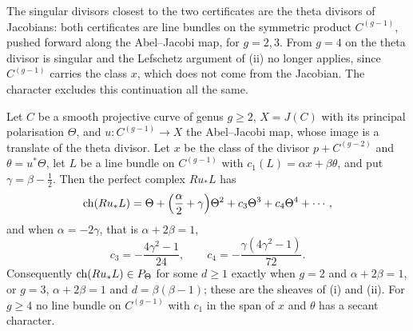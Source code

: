 The singular divisors closest to the two certificates are the theta divisors
of Jacobians: both certificates are line bundles on the symmetric product
$C^{(g-1)}$, pushed forward along the Abel--Jacobi map, for $g=2,3$. From
$g=4$ on the theta divisor is singular and the Lefschetz argument of
(ii) no longer applies, since $C^{(g-1)}$ carries
the class $x$, which does not come from the Jacobian. The character excludes
this continuation all the same.

\begin{proposition}
\label{prop:jacobiancontinuation}
Let $C$ be a smooth projective curve of genus $g\ge2$, $X=J(C)$ with its
principal polarisation $\Theta$, and $u\colon C^{(g-1)}\to X$ the
Abel--Jacobi map, whose image is a translate of the theta divisor. Let $x$
be the class of the divisor $p+C^{(g-2)}$ and $\theta=u^{*}\Theta$, let $L$
be a line bundle on $C^{(g-1)}$ with $c_{1}(L)=\alpha x+\beta\theta$, and put
$\gamma=\beta-\frac12$. Then the perfect complex $Ru_{*}L$ has
\[
  \operatorname{ch}(Ru_{*}L)=\Theta+\Bigl(\frac{\alpha}{2}+\gamma\Bigr)\Theta^{2}
  +c_{3}\Theta^{3}+c_{4}\Theta^{4}+\cdots,
\]
and when $\alpha=-2\gamma$, that is $\alpha+2\beta=1$,
\[
  c_{3}=-\frac{4\gamma^{2}-1}{24},\qquad c_{4}=-\frac{\gamma(4\gamma^{2}-1)}{72}.
\]
Consequently $\operatorname{ch}(Ru_{*}L)\in P_{\Theta}$ for some $d\ge1$ exactly when
$g=2$ and $\alpha+2\beta=1$, or $g=3$, $\alpha+2\beta=1$ and
$d=\beta(\beta-1)$; these are the sheaves of (i)
and (ii). For $g\ge4$ no line bundle on $C^{(g-1)}$ with $c_{1}$ in the span
of $x$ and $\theta$ has a secant character.
\end{proposition}

